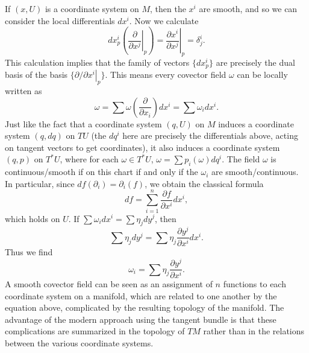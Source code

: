 If $(x,U)$ is a coordinate system on $M$, then the $x^i$ are smooth, and so we can consider the local differentials $dx^i$. Now we calculate
%
\[ dx^i_p \left( \left. \frac{\partial}{\partial x^j} \right|_p \right) = \left. \frac{\partial x^i}{\partial x^j} \right|_p = \delta^i_j. \]
%
This calculation implies that the family of vectors $\{ dx^i_p \}$ are precisely the dual basis of the basis $\{ \left. \partial/\partial x^i\right|_p \}$. This means every covector field $\omega$ can be locally written as
%
\[ \omega = \sum \omega \left( \frac{\partial}{\partial x_i} \right) dx^i = \sum \omega_i dx^i. \]
%
Just like the fact that a coordinate system $(q,U)$ on $M$ induces a coordinate system $(q,dq)$ on $TU$ (the $dq^i$ here are precisely the differentials above, acting on tangent vectors to get coordinates), it also induces a coordinate system $(q,p)$ on $T^*U$, where for each $\omega \in T^*U$, $\omega = \sum p_i(\omega) dq^i$. The field $\omega$ is continuous/smooth if on this chart if and only if the $\omega_i$ are smooth/continuous. In particular, since $df(\partial_i) = \partial_i(f)$, we obtain the classical formula
%
\[ df = \sum_{i = 1}^n \frac{\partial f}{\partial x^i} dx^i, \]
%
which holds on $U$. If $\sum \omega_i dx^i = \sum \eta_j dy^j$, then
%
\[ \sum \eta_j dy^j = \sum \eta_j \frac{\partial y^j}{\partial x^i} dx^i. \]
%
Thus we find
%
\[ \omega_i = \sum \eta_j \frac{\partial y^j}{\partial x^i}. \]
%
A smooth covector field can be seen as an assignment of $n$ functions to each coordinate system on a manifold, which are related to one another by the equation above, complicated by the resulting topology of the manifold. The advantage of the modern approach using the tangent bundle is that these complications are summarized in the topology of $TM$ rather than in the relations between the various coordinate systems.

